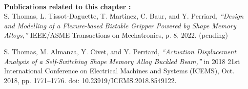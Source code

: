 %
%
\vspace*{\fill}
\noindent\hrulefill \\
\textbf{\large Publications related to this chapter :}\\

S. Thomas, L. Tissot-Daguette, T. Martinez, C. Baur, and Y. Perriard, \textit{“Design and Modelling of a Flexure-based Bistable Gripper Powered by Shape Memory Alloys,”} IEEE/ASME Transactions on Mechatronics, p. 8, 2022. (pending)

S. Thomas, M. Almanza, Y. Civet, and Y. Perriard, \textit{“Actuation Displacement Analysis of a Self-Switching Shape Memory Alloy Buckled Beam,”} in 2018 21st International Conference on Electrical Machines and Systems (ICEMS), Oct. 2018, pp. 1771–1776. doi: 10.23919/ICEMS.2018.8549122.
